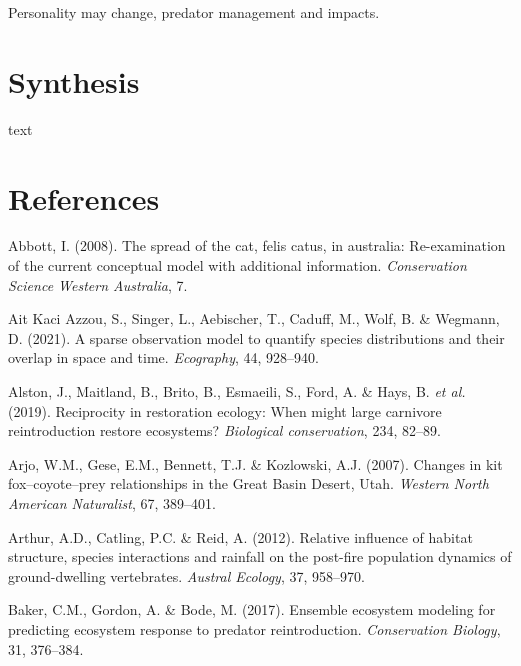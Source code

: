 \documentclass[11pt,a4paper,titlepage,twoside,openright]{style/unimelbthesis}
\begin{document}
\begin{mainmatter}
Personality may change, predator management and impacts.

\hypertarget{synthesis}{%
\chapter{Synthesis}\label{synthesis}}

text

\hypertarget{references}{%
\chapter*{References}\label{references}}


\noindent

\setlength{\parindent}{-0.20in}
\setlength{\leftskip}{0.20in}

\hypertarget{refs}{}
\leavevmode\hypertarget{ref-abbott2008spread}{}%
Abbott, I. (2008). The spread of the cat, felis catus, in australia: Re-examination of the current conceptual model with additional information. \emph{Conservation Science Western Australia}, 7.

\leavevmode\hypertarget{ref-azzou2021sparse}{}%
Ait Kaci Azzou, S., Singer, L., Aebischer, T., Caduff, M., Wolf, B. \& Wegmann, D. (2021). A sparse observation model to quantify species distributions and their overlap in space and time. \emph{Ecography}, 44, 928--940.

\leavevmode\hypertarget{ref-alston2019reciprocity}{}%
Alston, J., Maitland, B., Brito, B., Esmaeili, S., Ford, A. \& Hays, B. \emph{et al.} (2019). Reciprocity in restoration ecology: When might large carnivore reintroduction restore ecosystems? \emph{Biological conservation}, 234, 82--89.

\leavevmode\hypertarget{ref-arjo2007changes}{}%
Arjo, W.M., Gese, E.M., Bennett, T.J. \& Kozlowski, A.J. (2007). Changes in kit fox--coyote--prey relationships in the Great Basin Desert, Utah. \emph{Western North American Naturalist}, 67, 389--401.

\leavevmode\hypertarget{ref-arthur2012relative}{}%
Arthur, A.D., Catling, P.C. \& Reid, A. (2012). Relative influence of habitat structure, species interactions and rainfall on the post-fire population dynamics of ground-dwelling vertebrates. \emph{Austral Ecology}, 37, 958--970.

\leavevmode\hypertarget{ref-baker2017ensemble}{}%
Baker, C.M., Gordon, A. \& Bode, M. (2017). Ensemble ecosystem modeling for predicting ecosystem response to predator reintroduction. \emph{Conservation Biology}, 31, 376--384.


\end{mainmatter}
\end{document}
